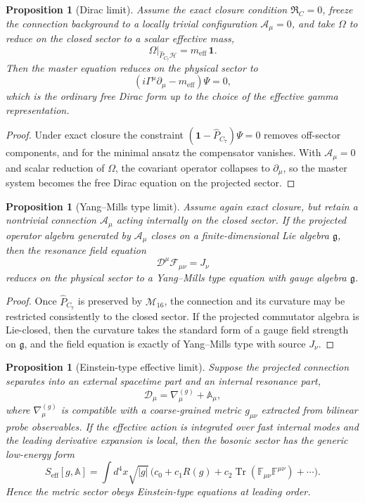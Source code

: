 \documentclass[12pt,a4paper]{article}
\newtheorem{proposition}[theorem]{Proposition}
\begin{document}
\begin{proposition}[Dirac limit]
Assume the exact closure condition $\mathfrak R_C=0$, freeze the connection
background to a locally trivial configuration $\mathcal A_\mu=0$, and take
$\Omega$ to reduce on the closed sector to a scalar effective mass,
\[
  \Omega\big|_{\hat P_{C_7}\mathcal H}
  = m_{\mathrm{eff}}\,\mathbf 1.
\]
Then the master equation reduces on the physical sector to
\[
  (i\Gamma^\mu\partial_\mu - m_{\mathrm{eff}})\Psi = 0,
\]
which is the ordinary free Dirac form up to the choice of the effective
gamma representation.
\end{proposition}

\begin{proof}
Under exact closure the constraint $(\mathbf 1-\hat P_{C_7})\Psi=0$ removes
off-sector components, and for the minimal ansatz the compensator vanishes.
With $\mathcal A_\mu=0$ and scalar reduction of $\Omega$, the covariant
operator collapses to $\partial_\mu$, so the master system becomes the free
Dirac equation on the projected sector.
\end{proof}

\begin{proposition}[Yang--Mills type limit]
Assume again exact closure, but retain a nontrivial connection
$\mathcal A_\mu$ acting internally on the closed sector.
If the projected operator algebra generated by $\mathcal A_\mu$ closes on a
finite-dimensional Lie algebra $\mathfrak g$, then the resonance field
equation
\[
  \mathcal D^\mu \mathcal F_{\mu\nu}=J_\nu
\]
reduces on the physical sector to a Yang--Mills type equation with gauge
algebra $\mathfrak g$.
\end{proposition}

\begin{proof}
Once $\hat P_{C_7}$ is preserved by $\mathcal M_{16}$, the connection and its
curvature may be restricted consistently to the closed sector.
If the projected commutator algebra is Lie-closed, then the curvature takes
the standard form of a gauge field strength on $\mathfrak g$, and the field
equation is exactly of Yang--Mills type with source $J_\nu$.
\end{proof}

\begin{proposition}[Einstein-type effective limit]
Suppose the projected connection separates into an external spacetime part
and an internal resonance part,
\[
  \mathcal D_\mu = \nabla_\mu^{(g)} + \mathbb A_\mu,
\]
where $\nabla_\mu^{(g)}$ is compatible with a coarse-grained metric
$g_{\mu\nu}$ extracted from bilinear probe observables.
If the effective action is integrated over fast internal modes and the
leading derivative expansion is local, then the bosonic sector has the
generic low-energy form
\[
  S_{\mathrm{eff}}[g,\mathbb A]
  = \int d^4x\sqrt{|g|}\,
    \bigl(c_0 + c_1 R(g) + c_2\operatorname{Tr}(\mathbb F_{\mu\nu}\mathbb F^{\mu\nu}) + \cdots\bigr).
\]
Hence the metric sector obeys Einstein-type equations at leading order.
\end{proposition}
\end{document}
